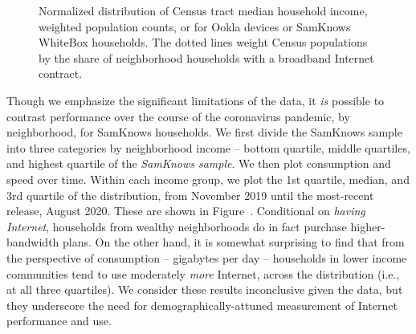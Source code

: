 \documentclass[11 pt]{amsart}
\begin{document}
\begin{figure}[]
\centering
{}
\caption{Normalized distribution of Census tract median household income, weighted population counts, or for Ookla devices or SamKnows WhiteBox households.  The dotted lines weight Census populations by the share of neighborhood households with a broadband Internet contract.}
\end{figure}


Though we emphasize the significant limitations of the data,
it \emph{is} possible to contrast performance over the course of the
coronavirus pandemic, by neighborhood,
for SamKnows households.
We first divide the SamKnows sample into three categories
by neighborhood income -- bottom quartile, middle quartiles, and highest quartile of the \emph{SamKnows sample}.
We then plot consumption and speed over time.
Within each income group,
we plot the 1st quartile, median, and 3rd quartile
of the distribution, from November 2019 until the most-recent release, August 2020.
These are shown in Figure~.
Conditional on \emph{having Internet},
households from wealthy neighborhoods do in fact purchase higher-bandwidth plans.
On the other hand, it is somewhat surprising to find that
from the perspective of consumption -- gigabytes per day --
households in lower income communities tend to use moderately \emph{more}
Internet, across the distribution (i.e., at all three quartiles).
We consider these results inconclusive given the data,
but they underscore the need for demographically-attuned
measurement of Internet performance and use.
\end{document}
